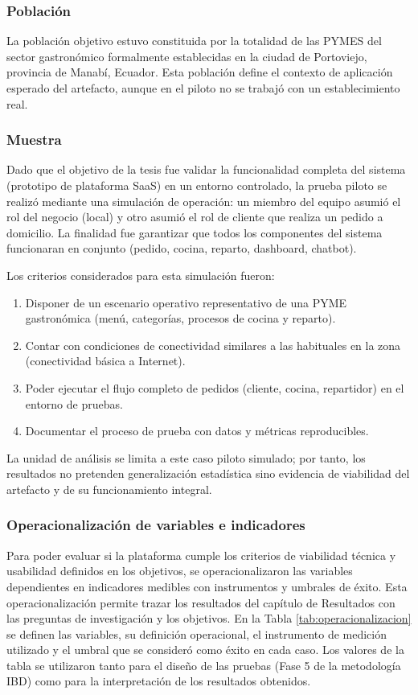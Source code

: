   \subsubsection{Población}
  La población objetivo estuvo constituida por la totalidad de las PYMES del sector gastronómico formalmente establecidas en la ciudad de Portoviejo, provincia de Manabí, Ecuador. Esta población define el contexto de aplicación esperado del artefacto, aunque en el piloto no se trabajó con un establecimiento real.

  \subsubsection{Muestra }
  Dado que el objetivo de la tesis fue validar la funcionalidad completa del sistema (prototipo de plataforma SaaS) en un entorno controlado, la prueba piloto se realizó mediante una simulación de operación: un miembro del equipo asumió el rol del negocio (local) y otro asumió el rol de cliente que realiza un pedido a domicilio. La finalidad fue garantizar que todos los componentes del sistema funcionaran en conjunto (pedido, cocina, reparto, dashboard, chatbot).

  Los criterios considerados para esta simulación fueron:
  \begin{enumerate}[label=\alph*)]
    \item Disponer de un escenario operativo representativo de una PYME gastronómica (menú, categorías, procesos de cocina y reparto).
    \item Contar con condiciones de conectividad similares a las habituales en la zona (conectividad básica a Internet).
    \item Poder ejecutar el flujo completo de pedidos (cliente, cocina, repartidor) en el entorno de pruebas.
    \item Documentar el proceso de prueba con datos y métricas reproducibles.
  \end{enumerate}

  La unidad de análisis se limita a este caso piloto simulado; por tanto, los resultados no pretenden generalización estadística sino evidencia de viabilidad del artefacto y de su funcionamiento integral.

  \subsubsection*{Operacionalización de variables e indicadores}

  Para poder evaluar si la plataforma cumple los criterios de viabilidad técnica y usabilidad definidos en los objetivos, se operacionalizaron las variables dependientes en indicadores medibles con instrumentos y umbrales de éxito. Esta operacionalización permite trazar los resultados del capítulo de Resultados con las preguntas de investigación y los objetivos. En la Tabla \ref{tab:operacionalizacion} se definen las variables, su definición operacional, el instrumento de medición utilizado y el umbral que se consideró como éxito en cada caso. Los valores de la tabla se utilizaron tanto para el diseño de las pruebas (Fase 5 de la metodología IBD) como para la interpretación de los resultados obtenidos.

